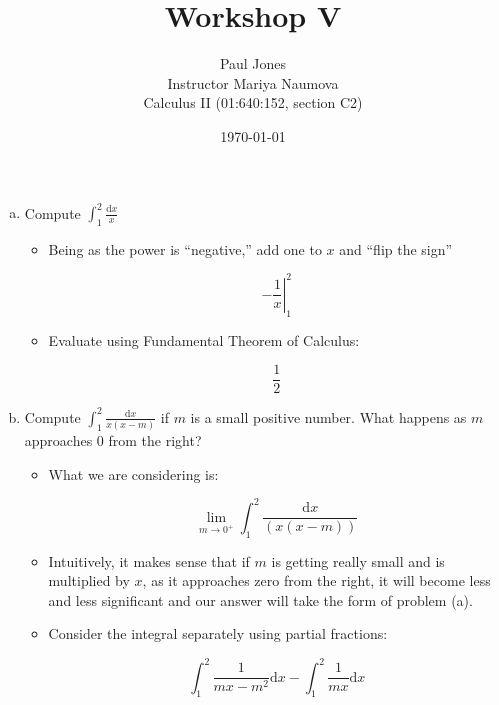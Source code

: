 \documentclass[11pt]{article}
\title{Workshop V}
\author{Paul Jones \\
		Instructor Mariya Naumova\\
		Calculus II (01:640:152, section C2)}
\date{\today}
\begin{document}
\maketitle

\pagebreak

\begin{enumerate}[a)]

\item Compute $\int_1^2 \! \frac{\mathrm{d}x}{x}$

	\begin{itemize}
	
	\item Being as the power is ``negative,'' 
	add one to $x$ and ``flip the sign''
	
	\begin{equation*}
	 \left. -\frac{1}{x}\right|_1^2
	\end{equation*}
	
	\item Evaluate using Fundamental Theorem of Calculus:
	
	\begin{equation*}
	\frac{1}{2}
	\end{equation*}
	
	\end{itemize}
	
\item Compute $\int_1^2 \! \frac{\mathrm{d}x}{x(x - m)}$ if $m$ is a small positive number. What happens as $m$ approaches 0 from the right?

	\begin{itemize}
	
	\item What we are considering is:
	
	\begin{equation*}
	\lim_{m \to 0^{+}}  \int_1^2 \frac{\mathrm{d}x}{(x (x-m))}
	\end{equation*}
	
	\item Intuitively, it makes sense that if $m$ is getting really small and is multiplied by $x$, as it approaches zero from the right, it will become less and less significant and our answer will take the form of problem (a). 
	
	\item Consider the integral separately using partial fractions:
	
	\begin{equation*}
	\int_1^2 \frac{1}{mx - m^2}\mathrm{d}x - \int_1^2 \frac{1}{mx}\mathrm{d}x
	\end{equation*}


\end{itemize}
\end{enumerate}
\end{document}
